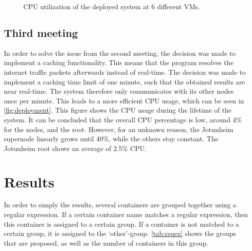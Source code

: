 \begin{figure}
    \caption{CPU utilization of the deployed system at 6 different VMs.}
    \label{fig:deployment}
\end{figure}

\subsection{Third meeting}
In order to solve the issue from the second meeting, the decision was made to implement a caching functionality. This means that the program resolves the internet traffic packets afterwards instead of real-time. The decision was made to implement a caching time limit of one minute, such that the obtained results are near real-time. The system therefore only communicates with its other nodes once per minute. This leads to a more efficient CPU usage, which can be seen in \autoref{fig:deployment}. This figure shows the CPU usage during the lifetime of the system. It can be concluded that the overall  CPU percentage is low, around 4\% for the nodes, and the root. However, for an unknown reason, the Jotunheim supernode linearly grows until 40\%, while the others stay constant. The Jotunheim root shows an average of 2.5\% CPU.

\section{Results}
In order to simply the results, several containers are grouped together using a regular expression. If a certain container name matches a regular expression, then this container is assigned to a certain group. If a container is not matched to a certain group, it is assigned to the `other'-group. \autoref{tab:reqex} shows the groups that are proposed, as well as the number of containers in this group.



